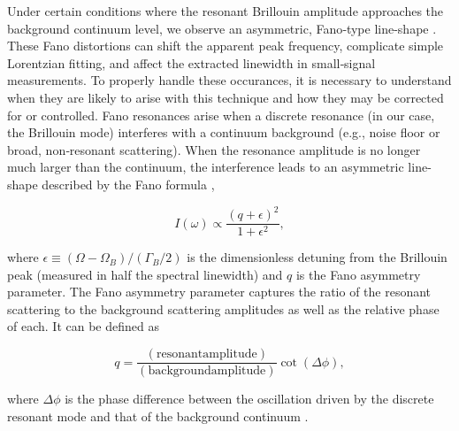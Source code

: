 Under certain conditions where the resonant Brillouin amplitude approaches the background continuum level, we observe an asymmetric, Fano‐type line-shape \cite{fano1961effects, limonov2017fano, limonov2021fano, kroner2008nonlinear}. These Fano distortions can shift the apparent peak frequency, complicate simple Lorentzian fitting, and affect the extracted linewidth in small‐signal measurements. \cite{miroshnichenko2010fano} To properly handle these occurances, it is necessary to understand when they are likely to arise with this technique and how they may be corrected for or controlled. Fano resonances arise when a discrete resonance (in our case, the Brillouin mode) interferes with a continuum background (e.g., noise floor or broad, non‐resonant scattering). When the resonance amplitude is no longer much larger than the continuum, the interference leads to an asymmetric line-shape described by the Fano formula \cite{fano1961effects},

\begin{equation}
I(\omega) \propto \frac{(q + \epsilon)^2}{1 + \epsilon^2},
\label{eq:fano}
\end{equation}

where \(\epsilon \equiv (\Omega - \Omega_{B})/(\Gamma_{B}/2)\) is the dimensionless detuning from the Brillouin peak (measured in half the spectral linewidth) and \(q\) is the Fano asymmetry parameter. The Fano asymmetry parameter captures the ratio of the resonant scattering to the background scattering amplitudes as well as the relative phase of each. It can be defined as

\begin{equation}
  q = \frac{(\mathrm{resonant amplitude})}{(\mathrm{background amplitude})}\cot{(\Delta\phi)},
\end{equation}

where \(\Delta\phi\) is the phase difference between the oscillation driven by the discrete resonant mode and that of the background continuum \cite{limonov2017fano, ko2023full, gu2020fano}.

